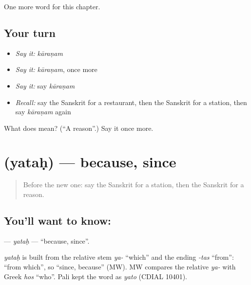 \begin{grammarlens}[title={What you've built}]
One more word for this chapter.
\end{grammarlens}

\subsection*{Your turn}
\begin{itemize}
\raggedright
  \item \emph{Say it:} \emph{kāraṇam}
  \item \emph{Say it:} \emph{kāraṇam}, once more
  \item \emph{Say it:} say \emph{kāraṇam}
  \item \emph{Recall:} say the Sanskrit for a restaurant, then the Sanskrit for a station, then say \emph{kāraṇam} again
\end{itemize}

\begin{tcolorbox}[breakable,colback=teal!4,colframe=teal!35!black,title={Before you move on}]
What does  mean? (\textquotedblleft{}A reason\textquotedblright{}.) Say it once more.
\end{tcolorbox}
\section[\texorpdfstring{\sk{यतः} (yataḥ)}{यतः (yataḥ)}]{ (yataḥ) — because, since}

\label{lesson:SA-C97-yatah}



\begin{quote}
Before the new one: say the Sanskrit for a station, then the Sanskrit for a reason.
\end{quote}

\subsection*{You'll want to know: }
\textbf{} — \emph{yataḥ} — \textquotedblleft{}because, since\textquotedblright{}.

\begin{cousinweb}
\emph{yataḥ} is built from the relative stem \emph{ya-} \textquotedblleft{}which\textquotedblright{} and the ending \emph{-tas} \textquotedblleft{}from\textquotedblright{}: \textquotedblleft{}from which\textquotedblright{}, so \textquotedblleft{}since, because\textquotedblright{} (MW). MW compares the relative \emph{ya-} with Greek \emph{hos} \textquotedblleft{}who\textquotedblright{}. Pali kept the word as \emph{yato} (CDIAL 10401).
\end{cousinweb}

